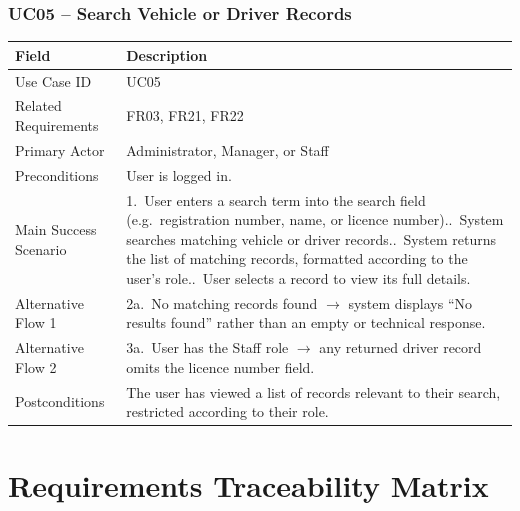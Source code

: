 \documentclass[11pt,a4paper]{article}
\begin{document}
\subsubsection*{UC05 -- Search Vehicle or Driver Records}
\begin{longtable}{@{}p{3.2cm}p{11.3cm}@{}}
\toprule
Field & Description \\
\midrule
\endhead
Use Case ID & UC05 \\
Related Requirements & FR03, FR21, FR22 \\
Primary Actor & Administrator, Manager, or Staff \\
Preconditions & User is logged in. \\
Main Success Scenario &
1.\ User enters a search term into the search field (e.g.\ registration
number, name, or licence number).\newline
2.\ System searches matching vehicle or driver records.\newline
3.\ System returns the list of matching records, formatted according to
the user's role.\newline
4.\ User selects a record to view its full details. \\
Alternative Flow 1 & 2a.\ No matching records found $\rightarrow$ system
displays ``No results found'' rather than an empty or technical
response. \\
Alternative Flow 2 & 3a.\ User has the Staff role $\rightarrow$ any
returned driver record omits the licence number field. \\
Postconditions & The user has viewed a list of records relevant to their
search, restricted according to their role. \\
\bottomrule
\end{longtable}

\section{Requirements Traceability Matrix}
\end{document}
